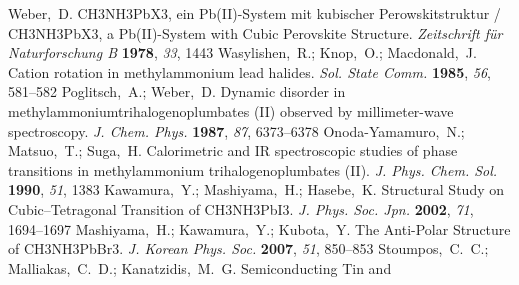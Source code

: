 \documentclass[journal=jpccck,manuscript=article,layout=twocolumn]{achemso}
\begin{document}
\begin{mcitethebibliography}{62}
Weber,~D. CH3NH3PbX3, ein Pb(II)-System mit kubischer Perowskitstruktur /
  CH3NH3PbX3, a Pb(II)-System with Cubic Perovskite Structure.
  \emph{Zeitschrift für Naturforschung B} \textbf{1978}, \emph{33}, 1443\relax
\mciteBstWouldAddEndPuncttrue
\mciteSetBstMidEndSepPunct{\mcitedefaultmidpunct}
{\mcitedefaultendpunct}{\mcitedefaultseppunct}\relax
\EndOfBibitem
{}
Wasylishen,~R.; Knop,~O.; Macdonald,~J. Cation rotation in methylammonium lead
  halides. \emph{Sol. State Comm.} \textbf{1985}, \emph{56}, 581--582\relax
\mciteBstWouldAddEndPuncttrue
\mciteSetBstMidEndSepPunct{\mcitedefaultmidpunct}
{\mcitedefaultendpunct}{\mcitedefaultseppunct}\relax
\EndOfBibitem
{}
Poglitsch,~A.; Weber,~D. Dynamic disorder in methylammoniumtrihalogenoplumbates
  (II) observed by millimeter-wave spectroscopy. \emph{J. Chem. Phys.}
  \textbf{1987}, \emph{87}, 6373--6378\relax
\mciteBstWouldAddEndPuncttrue
\mciteSetBstMidEndSepPunct{\mcitedefaultmidpunct}
{\mcitedefaultendpunct}{\mcitedefaultseppunct}\relax
\EndOfBibitem
{}
Onoda-Yamamuro,~N.; Matsuo,~T.; Suga,~H. Calorimetric and IR spectroscopic
  studies of phase transitions in methylammonium trihalogenoplumbates (II).
  \emph{J. Phys. Chem. Sol.} \textbf{1990}, \emph{51}, 1383\relax
\mciteBstWouldAddEndPuncttrue
\mciteSetBstMidEndSepPunct{\mcitedefaultmidpunct}
{\mcitedefaultendpunct}{\mcitedefaultseppunct}\relax
\EndOfBibitem
{}
Kawamura,~Y.; Mashiyama,~H.; Hasebe,~K. Structural Study on Cubic–Tetragonal
  Transition of CH3NH3PbI3. \emph{J. Phys. Soc. Jpn.} \textbf{2002}, \emph{71},
  1694--1697\relax
\mciteBstWouldAddEndPuncttrue
\mciteSetBstMidEndSepPunct{\mcitedefaultmidpunct}
{\mcitedefaultendpunct}{\mcitedefaultseppunct}\relax
\EndOfBibitem
{}
Mashiyama,~H.; Kawamura,~Y.; Kubota,~Y. The Anti-Polar Structure of
  CH3NH3PbBr3. \emph{J. Korean Phys. Soc.} \textbf{2007}, \emph{51},
  850--853\relax
\mciteBstWouldAddEndPuncttrue
\mciteSetBstMidEndSepPunct{\mcitedefaultmidpunct}
{\mcitedefaultendpunct}{\mcitedefaultseppunct}\relax
\EndOfBibitem
{}
Stoumpos,~C.~C.; Malliakas,~C.~D.; Kanatzidis,~M.~G. Semiconducting Tin and

\end{mcitethebibliography}
\end{document}
